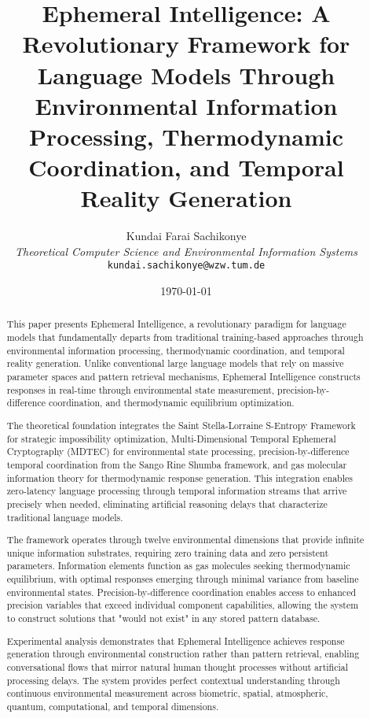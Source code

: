 \documentclass[12pt,a4paper]{article}
\title{\textbf{Ephemeral Intelligence: A Revolutionary Framework for Language Models Through Environmental Information Processing, Thermodynamic Coordination, and Temporal Reality Generation}}
\author{
Kundai Farai Sachikonye\\
\textit{Theoretical Computer Science and Environmental Information Systems}\\
\texttt{kundai.sachikonye@wzw.tum.de}
}
\date{\today}
\begin{document}
\maketitle

\begin{abstract}
This paper presents Ephemeral Intelligence, a revolutionary paradigm for language models that fundamentally departs from traditional training-based approaches through environmental information processing, thermodynamic coordination, and temporal reality generation. Unlike conventional large language models that rely on massive parameter spaces and pattern retrieval mechanisms, Ephemeral Intelligence constructs responses in real-time through environmental state measurement, precision-by-difference coordination, and thermodynamic equilibrium optimization.

The theoretical foundation integrates the Saint Stella-Lorraine S-Entropy Framework for strategic impossibility optimization, Multi-Dimensional Temporal Ephemeral Cryptography (MDTEC) for environmental state processing, precision-by-difference temporal coordination from the Sango Rine Shumba framework, and gas molecular information theory for thermodynamic response generation. This integration enables zero-latency language processing through temporal information streams that arrive precisely when needed, eliminating artificial reasoning delays that characterize traditional language models.

The framework operates through twelve environmental dimensions that provide infinite unique information substrates, requiring zero training data and zero persistent parameters. Information elements function as gas molecules seeking thermodynamic equilibrium, with optimal responses emerging through minimal variance from baseline environmental states. Precision-by-difference coordination enables access to enhanced precision variables that exceed individual component capabilities, allowing the system to construct solutions that "would not exist" in any stored pattern database.

Experimental analysis demonstrates that Ephemeral Intelligence achieves response generation through environmental construction rather than pattern retrieval, enabling conversational flows that mirror natural human thought processes without artificial processing delays. The system provides perfect contextual understanding through continuous environmental measurement across biometric, spatial, atmospheric, quantum, computational, and temporal dimensions.


\end{abstract}
\end{document}

